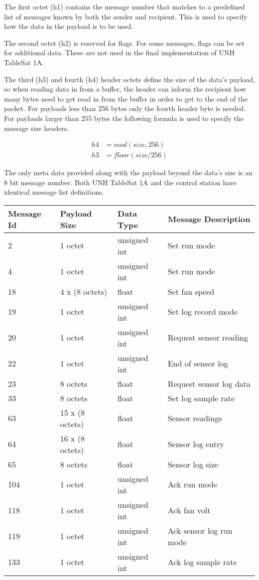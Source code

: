 The first octet (h1) contains the message number that matches to a predefined list
of messages known by both the sender and recipient.  This is used to specify
how the data in the payload is to be used.

The second octet (h2) is reserved for flags.  For some messages, flags can be
set for additional data.  These are not used in the final implementation of
UNH TableSat 1A.

The third (h3) and fourth (h4) header octets define the size of the data's payload, so when reading
data in from a buffer, the header can inform the recipient how many bytes need
to get read in from the buffer in order to get to the end of the packet.  For
payloads less than 256 bytes only the fourth header byte is needed.  For
payloads larger than 255 bytes the following formula is used to specify the
message size headers.

\begin{align}
h4 &= mod(size, 256) \\
h3 &= floor(size / 256)
\end{align}

The only meta data provided along with the payload beyond the data's size is
an 8 bit message number.  Both UNH TableSat 1A and the control station have
identical message list definitions.

\begin{center}
    \begin{tabular}{| l | l | l | l |}
    \hline
    Message Id & Payload Size & Data Type & Message Description \\ \hline
    2 & 1 octet & unsigned int & Set run mode \\ \hline
    4 & 1 octet & unsigned int & Set run mode \\ \hline
    18 & 4 x (8 octets) & float & Set fan speed \\ \hline
    19 & 1 octet & unsigned int & Set log record mode \\ \hline
    20 & 1 octet & unsigned int & Request sensor reading \\ \hline
    22 & 1 octet & unsigned int & End of sensor log \\ \hline
    23 & 8 octets & float & Request sensor log data \\ \hline
    33 & 8 octets & float & Set log sample rate \\ \hline
    63 & 15 x (8 octets) & float & Sensor readings \\ \hline
    64 & 16 x (8 octets) & float & Sensor log entry \\ \hline
    65 & 8 octets & float & Sensor log size \\ \hline
    104 & 1 octet & unsigned int & Ack run mode \\ \hline
    118 & 1 octet & unsigned int & Ack fan volt \\ \hline
    119 & 1 octet & unsigned int & Ack sensor log run mode \\ \hline
    133 & 1 octet & unsigned int & Ack log sample rate \\ \hline
    \end{tabular}
\end{center}

